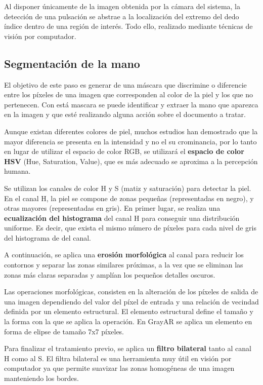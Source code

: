 Al disponer únicamente de la imagen obtenida por la cámara del
sistema, la detección de una pulsación se abstrae a la localización
del extremo del dedo índice dentro de una región de interés. Todo
ello, realizado mediante técnicas de visión por computador.

\subsection{Segmentación de la mano}
El objetivo de este paso es generar de una máscara que discrimine o
diferencie entre los píxeles de una imagen que corresponden al color
de la piel y los que no pertenecen. Con está mascara se puede identificar y extraer la mano que
aparezca en la imagen y que esté realizando alguna acción sobre el documento a tratar.


Aunque existan diferentes colores de piel, muchos estudios han
demostrado que la mayor diferencia se presenta en la intensidad y no
el su crominancia, por lo tanto en lugar de utilizar el espacio de
color RGB, se utilizará el  \textbf{espacio de color HSV} (Hue, Saturation,
Value), que es más adecuado se aproxima a la percepción humana.


Se utilizan los canales de color H y S (matiz y saturación) para
detectar la piel. En el canal H, la piel se compone de zonas pequeñas
(representadas en negro), y otras mayores (representadas en gris). En
primer lugar, se realiza una \textbf{ecualización del histograma} del canal H
para conseguir una distribución uniforme. Es decir, que exista el
mismo número de píxeles para cada nivel de gris del histograma de del
canal.

A continuación, se aplica una \textbf{erosión morfológica} al canal para reducir los
contornos y separar las zonas similares próximas, a la vez que se
eliminan las zonas más claras separadas y amplían los pequeños detalles
oscuros.

Las operaciones morfológicas, consisten en la alteración de los píxeles
de salida de una imagen dependiendo del valor del píxel de entrada y
una relación de vecindad definida por un elemento estructural. El
elemento estructural define el tamaño y la forma con la que se aplica
la operación. En GrayAR se aplica un elemento en forma de elipse de
tamaño 7x7 píxeles.

Para finalizar el tratamiento previo, se aplica un \textbf{filtro bilateral}
tanto al canal H como al S. El filtra bilateral es una herramienta muy
útil en visión por computador ya que permite suavizar las zonas
homogéneas de una imagen manteniendo los bordes.

